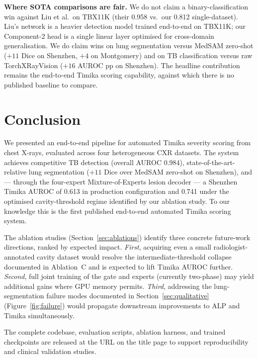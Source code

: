\documentclass{article}
\begin{document}
\textbf{Where SOTA comparisons are fair.} We do not claim a binary-classification win against Liu et al.\ on TBX11K (their 0.958 vs.\ our 0.812 single-dataset). Liu's network is a heavier detection model trained end-to-end on TBX11K; our Component-2 head is a single linear layer optimised for cross-domain generalisation. We do claim wins on lung segmentation versus MedSAM zero-shot ($+11$ Dice on Shenzhen, $+4$ on Montgomery) and on TB classification versus raw TorchXRayVision ($+16$ AUROC pp on Shenzhen). The headline contribution remains the end-to-end Timika scoring capability, against which there is no published baseline to compare.

\section{Conclusion}

We presented an end-to-end pipeline for automated Timika severity scoring from chest X-rays, evaluated across four heterogeneous CXR datasets. The system achieves competitive TB detection (overall AUROC 0.984), state-of-the-art-relative lung segmentation ($+11$ Dice over MedSAM zero-shot on Shenzhen), and --- through the four-expert Mixture-of-Experts lesion decoder --- a Shenzhen Timika AUROC of 0.613 in production configuration and 0.741 under the optimised cavity-threshold regime identified by our ablation study. To our knowledge this is the first published end-to-end automated Timika scoring system.

The ablation studies (Section~\ref{sec:ablations}) identify three concrete future-work directions, ranked by expected impact. \emph{First}, acquiring even a small radiologist-annotated cavity dataset would resolve the intermediate-threshold collapse documented in Ablation~C and is expected to lift Timika AUROC further. \emph{Second}, full joint training of the gate and experts (currently two-phase) may yield additional gains where GPU memory permits. \emph{Third}, addressing the lung-segmentation failure modes documented in Section~\ref{sec:qualitative} (Figure~\ref{fig:failure}) would propagate downstream improvements to ALP and Timika simultaneously.

The complete codebase, evaluation scripts, ablation harness, and trained checkpoints are released at the URL on the title page to support reproducibility and clinical validation studies.



\end{document}
